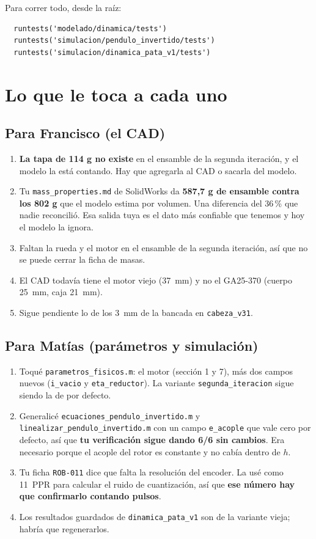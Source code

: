 \documentclass[11pt,a4paper]{article}
\begin{document}
Para correr todo, desde la raíz:
\begin{verbatim}
  runtests('modelado/dinamica/tests')
  runtests('simulacion/pendulo_invertido/tests')
  runtests('simulacion/dinamica_pata_v1/tests')
\end{verbatim}

\section{Lo que le toca a cada uno}

\subsection*{Para Francisco (el CAD)}

\begin{enumerate}[nosep]
\item \textbf{La tapa de 114 g no existe} en el ensamble de la segunda iteración, y el modelo la está
  contando. Hay que agregarla al CAD o sacarla del modelo.
\item Tu \texttt{mass\_properties.md} de SolidWorks da \textbf{587,7 g de ensamble contra los 802 g}
  que el modelo estima por volumen. Una diferencia del 36\,\% que nadie reconcilió. Esa salida tuya
  es el dato más confiable que tenemos y hoy el modelo la ignora.
\item Faltan la rueda y el motor en el ensamble de la segunda iteración, así que no se puede cerrar la
  ficha de masas.
\item El CAD todavía tiene el motor viejo (37~mm) y no el GA25-370 (cuerpo 25~mm, caja 21~mm).
\item Sigue pendiente lo de los 3~mm de la bancada en \texttt{cabeza\_v31}.
\end{enumerate}

\subsection*{Para Matías (parámetros y simulación)}

\begin{enumerate}[nosep]
\item Toqué \texttt{parametros\_fisicos.m}: el motor (sección 1 y 7), más dos campos nuevos
  (\texttt{i\_vacio} y \texttt{eta\_reductor}). La variante \texttt{segunda\_iteracion} sigue siendo
  la de por defecto.
\item Generalicé \texttt{ecuaciones\_pendulo\_invertido.m} y
  \texttt{linealizar\_pendulo\_invertido.m} con un campo \texttt{e\_acople} que vale cero por defecto,
  así que \textbf{tu verificación sigue dando 6/6 sin cambios}. Era necesario porque el acople del
  rotor es constante y no cabía dentro de $h$.
\item Tu ficha \texttt{ROB-011} dice que falta la resolución del encoder. La usé como 11~PPR para
  calcular el ruido de cuantización, así que \textbf{ese número hay que confirmarlo contando pulsos}.
\item Los resultados guardados de \texttt{dinamica\_pata\_v1} son de la variante vieja; habría que
  regenerarlos.
\end{enumerate}
\end{document}
